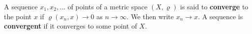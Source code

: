 A sequence $x_1, x_2, \ldots$ of points of a metric space $(X, \varrho)$ is said to \textbf{converge} to the point $x$ if $\varrho(x_n, x) \to 0$ as $n \to \infty$. We then write $x_n \to x$. A sequence is \textbf{convergent} if it converges to some point of $X$.
